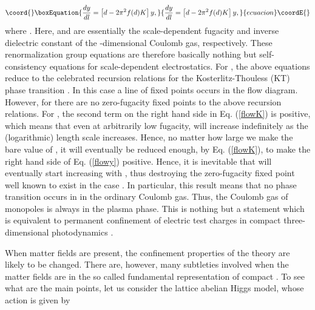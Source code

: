 \documentclass[a4paper,showpacs,preprintnumbers,amsmath,amssymb,prl,twocolumn]{revtex4}
\begin{document}
\begin{equation}\coord{}\boxEquation{
\label{flowy}
\frac{dy}{dl}=\left[d-2\pi^2f(d)K\right]y,
}{
\frac{dy}{dl}=\left[d-2\pi^2f(d)K\right]y,
}{ecuacion}\coordE{}\end{equation}
where \coordHE{}. 
Here, \coordHE{} and \coordHE{} are essentially the scale-dependent fugacity and 
inverse dielectric constant of the \coordHE{}-dimensional Coulomb gas, respectively. 
These renormalization group equations are therefore basically 
nothing but self-consistency equations for scale-dependent electrostatics. For 
\coordHE{}, the above equations reduce to the celebrated recursion relations for 
the Kosterlitz-Thouless (KT) phase transition \cite{KT}. In this case a line 
of fixed points occurs in the flow diagram. However, for \coordHE{} there are 
no zero-fugacity fixed points to the above recursion relations. For \coordHE{}, 
the second term  on the right hand side in Eq. (\ref{flowK}) is positive, 
which means that even at arbitrarily low fugacity, \coordHE{} will 
increase indefinitely as the (logarithmic) length scale \coordHE{} increases. Hence, 
no matter how large we make the bare value of \coordHE{}, it will eventually be 
reduced enough, by Eq. (\ref{flowK}), to make the right hand side of Eq. 
(\ref{flowy}) positive. Hence, it is inevitable that \coordHE{} will eventually 
start increasing with \coordHE{}, thus destroying the zero-fugacity fixed point well 
known to exist in the case \coordHE{} \cite{KT}.  In particular, this result means 
that no phase transition occurs in \coordHE{} in the ordinary Coulomb gas. 
Thus, the Coulomb gas of monopoles is always in the plasma phase. This 
is nothing but a statement which is equivalent to permanent confinement 
of electric test charges in compact three-dimensional photodynamics 
\cite{Polyakov}.

When matter fields are present, the confinement properties 
of the theory are likely to be changed. There are, however, 
many subtleties involved when the matter fields are in 
the so called fundamental representation of compact \coordHE{}. 
To see what are the main points, let us consider the lattice 
abelian Higgs model, whose action is given by
\end{document}
